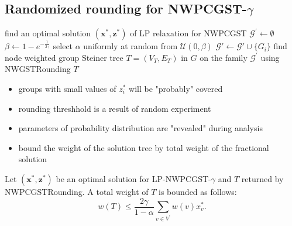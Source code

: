 \documentclass{beamer}
\begin{document}
\subsection*{Randomized rounding for NWPCGST-$\gamma$}
\begin{frame}{\insertsection}{\insertsubsection}
    \begin{algorithmic}[1]
           \State find an optimal solution $\left(\mathbf{x}^\ast,\mathbf{z}^\ast\right)$ of LP relaxation for NWPCGST
           \State $\mathcal{G}^\prime\gets\emptyset$
           \State $\beta\gets 1-e^{-\frac{1}{2\gamma}}$
           \State select $\alpha$ uniformly at random from $\mathcal{U}\left(0,\beta\right)$
                    \State $\mathcal{G}'\gets \mathcal{G}'\cup\{G_i\}$
                \EndIf
           \EndFor
           \State find node weighted group Steiner tree $T=\left(V_T,E_T\right)$ in $G$ on the family $\mathcal{G}^\prime$ using \textrm{NWGSTRounding}
           \State \Return $T$
        \EndProcedure
        \end{algorithmic}
\end{frame}


\begin{frame}{\insertsection}{\insertsubsection}
    \begin{itemize}
        \item groups with small values of $z_i^{\ast}$ will be "probably" covered
        \item rounding threshhold is a result of random experiment
        \item parameters of probability distribution are "revealed" during analysis
        
    \end{itemize}


\end{frame}

\begin{frame}{\insertsection}{\insertsubsection}
    \begin{itemize}
        \item bound the weight of the solution tree by total \alert{weight} of the fractional solution
    \end{itemize}
    \begin{lemma}
        Let $(\mathbf{x}^\ast,\mathbf{z}^\ast)$ be an optimal solution for LP-NWPCGST-$\gamma$ and $T$ returned by \textrm{NWPCGSTRounding}. A total weight of $T$ is bounded as follows:
$$w(T)\leq\frac{2\gamma}{1-\alpha}\sum_{v\in V^\prime}{w(v)x_v^\ast}.$$
    \end{lemma}

\end{frame}
\end{document}
